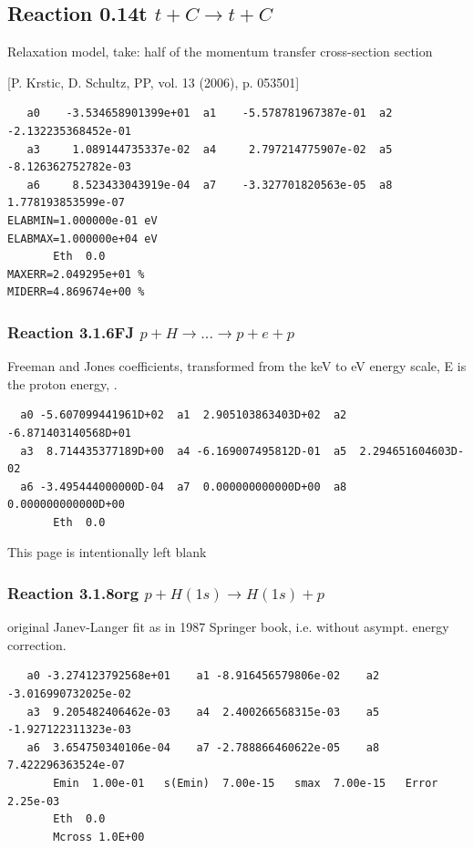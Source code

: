 \documentclass[12pt,dvipdfmx]{article}
\begin{document}
\subsection{
Reaction 0.14t   $ t + C \rightarrow t + C $
}

Relaxation model, take: half of the momentum transfer cross-section
section

[P. Krstic, D. Schultz, PP, vol. 13 (2006), p. 053501]

\begin{small}\begin{verbatim}
   a0    -3.534658901399e+01  a1    -5.578781967387e-01  a2    -2.132235368452e-01
   a3     1.089144735337e-02  a4     2.797214775907e-02  a5    -8.126362752782e-03
   a6     8.523433043919e-04  a7    -3.327701820563e-05  a8     1.778193853599e-07
ELABMIN=1.000000e-01 eV
ELABMAX=1.000000e+04 eV
       Eth  0.0
MAXERR=2.049295e+01 %
MIDERR=4.869674e+00 %
\end{verbatim}\end{small}

\newpage

\subsubsection{
Reaction 3.1.6FJ
$ p + H \rightarrow . . . \rightarrow p + e + p $ }

Freeman and Jones coefficients, transformed from the keV to eV energy scale,
E is the proton energy, \cite{kn:Freeman}.

\begin{small}\begin{verbatim}
  a0 -5.607099441961D+02  a1  2.905103863403D+02  a2 -6.871403140568D+01
  a3  8.714435377189D+00  a4 -6.169007495812D-01  a5  2.294651604603D-02
  a6 -3.495444000000D-04  a7  0.000000000000D+00  a8  0.000000000000D+00
       Eth  0.0
\end{verbatim}\end{small}
\newpage
This page is intentionally left blank
\newpage

\subsubsection{
Reaction 3.1.8org $  p + H(1s) \rightarrow H(1s) + p  $
}
original Janev-Langer fit as in 1987 Springer book, i.e. without asympt. energy correction.


\begin{small}\begin{verbatim}
   a0 -3.274123792568e+01    a1 -8.916456579806e-02    a2 -3.016990732025e-02
   a3  9.205482406462e-03    a4  2.400266568315e-03    a5 -1.927122311323e-03
   a6  3.654750340106e-04    a7 -2.788866460622e-05    a8  7.422296363524e-07
       Emin  1.00e-01   s(Emin)  7.00e-15   smax  7.00e-15   Error  2.25e-03
       Eth  0.0
       Mcross 1.0E+00
\end{verbatim}\end{small}
\end{document}
